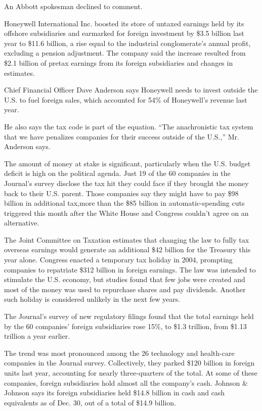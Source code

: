 \begin{select}
An Abbott spokesman declined to comment.

Honeywell International Inc. boosted its store of untaxed earnings held by its offshore subsidiaries and earmarked for foreign investment by \$3.5 billion last year to \$11.6 billion, a rise equal to the industrial conglomerate's annual profit, excluding a pension adjustment. The company said the increase resulted from \$2.1 billion of pretax earnings from its foreign subsidiaries and changes in estimates.

Chief Financial Officer Dave Anderson says Honeywell needs to invest outside the U.S. to fuel foreign sales, which accounted for 54\% of Honeywell's revenue last year.

He also says the tax code is part of the equation. ``The anachronistic tax system that we have penalizes companies for their success outside of the U.S.,'' Mr. Anderson says.

The amount of money at stake is significant, particularly when the U.S. budget deficit is high on the political agenda. Just 19 of the 60 companies in the Journal's survey disclose the tax hit they could face if they brought the money back to their U.S. parent. Those companies say they might have to pay \$98 billion in additional tax,more than the \$85 billion in automatic-spending cuts triggered this month after the White House and Congress couldn't agree on an alternative.

The Joint Committee on Taxation estimates that changing the law to fully tax overseas earnings would generate an additional \$42 billion for the Treasury this year alone. Congress enacted a temporary tax holiday in 2004, prompting companies to repatriate \$312 billion in foreign earnings. The law was intended to stimulate the U.S. economy, but studies found that few jobs were created and most of the money was used to repurchase shares and pay dividends. Another such holiday is considered unlikely in the next few years.

The Journal's survey of new regulatory filings found that the total earnings held by the 60 companies' foreign subsidiaries rose 15\%, to \$1.3 trillion, from \$1.13 trillion a year earlier.

The trend was most pronounced among the 26 technology and health-care companies in the Journal survey. Collectively, they parked \$120 billion in foreign units last year, accounting for nearly three-quarters of the total. At some of these companies, foreign subsidiaries hold almost all the company's cash. Johnson \& Johnson says its foreign subsidiaries held \$14.8 billion in cash and cash equivalents as of Dec. 30, out of a total of \$14.9 billion.


\end{select}
